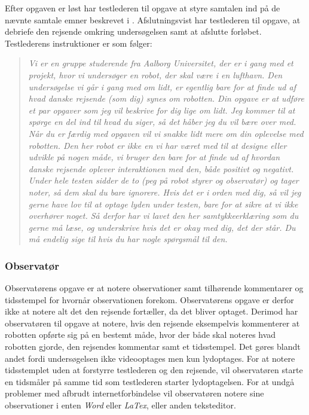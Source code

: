 Efter opgaven er løst har testlederen til opgave at styre samtalen ind på de nævnte samtale emner beskrevet i . Afslutningsvist har testlederen til opgave, at debriefe den rejsende omkring undersøgelsen samt at afslutte forløbet.\blankline
%
Testlederens instruktioner er som følger:
%
\begin{quotation}
\noindent
\textit{Vi er en gruppe studerende fra Aalborg Universitet, der er i gang med et projekt, hvor vi undersøger en robot, der skal være i en lufthavn. Den undersøgelse vi går i gang med om lidt, er egentlig bare for at finde ud af hvad danske rejsende (som dig) synes om robotten.\blankline
%
Din opgave er at udføre et par opgaver som jeg vil beskrive for dig lige om lidt. Jeg kommer til at spørge en del ind til hvad du siger, så det håber jeg du vil bære over med. Når du er færdig med opgaven vil vi snakke lidt mere om din oplevelse med robotten.\blankline  
%
Den her robot er ikke en vi har været med til at designe eller udvikle på nogen måde, vi bruger den bare for at finde ud af hvordan danske rejsende oplever interaktionen med den, både positivt og negativt.\blankline
%
Under hele testen sidder de to (peg på robot styrer og observatør) og tager noter, så dem skal du bare ignorere. \blankline
%
Hvis det er i orden med dig, så vil jeg gerne have lov til at optage lyden under testen, bare for at sikre at vi ikke overhører noget. Så derfor har vi lavet den her samtykkeerklæring som du gerne må læse, og underskrive hvis det er okay med dig, det der står. Du må endelig sige til hvis du har nogle spørgsmål til den.}
\end{quotation}
   

\subsubsection*{Observatør}
Observatørens opgave er at notere observationer samt tilhørende kommentarer og tidsstempel for hvornår observationen forekom. Observatørens opgave er derfor ikke at notere alt det den rejsende fortæller, da det bliver optaget. Derimod har observatøren til opgave at notere, hvis den rejsende eksempelvis kommenterer at robotten opførte sig på en bestemt måde, hvor der både skal noteres hvad robotten gjorde, den rejsendes kommentar samt et tidsstempel. Det gøres blandt andet fordi undersøgelsen ikke videooptages men kun lydoptages. For at notere tidsstemplet uden at forstyrre testlederen og den rejsende, vil observatøren starte en tidsmåler på samme tid som testlederen starter lydoptagelsen. For at undgå problemer med afbrudt internetforbindelse vil observatøren notere sine observationer i enten \textit{Word} eller \textit{LaTex}, eller anden teksteditor.      
 

